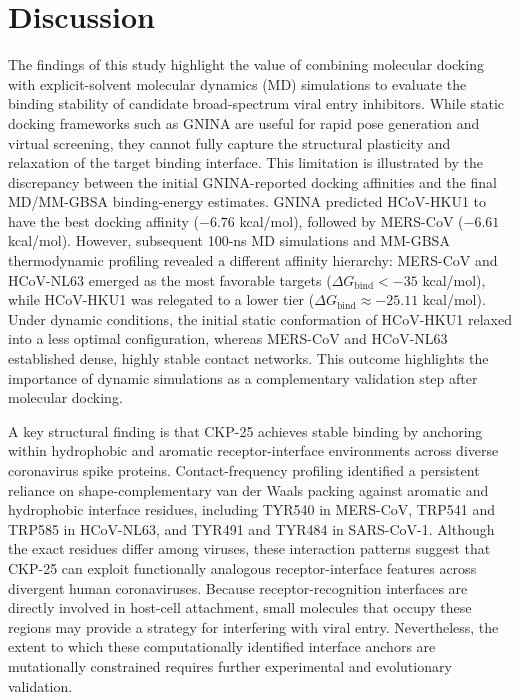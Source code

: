 \documentclass[pharmaceuticals,article,submit,pdftex,moreauthors]{Definitions/mdpi}
\begin{document}
\section{Discussion}
The findings of this study highlight the value of combining molecular docking with explicit-solvent molecular dynamics (MD) simulations to evaluate the binding stability of candidate broad-spectrum viral entry inhibitors. While static docking frameworks such as GNINA are useful for rapid pose generation and virtual screening, they cannot fully capture the structural plasticity and relaxation of the target binding interface. This limitation is illustrated by the discrepancy between the initial GNINA-reported docking affinities and the final MD/MM-GBSA binding-energy estimates. GNINA predicted HCoV-HKU1 to have the best docking affinity ($-6.76$ kcal/mol), followed by MERS-CoV ($-6.61$ kcal/mol). However, subsequent 100-ns MD simulations and MM-GBSA thermodynamic profiling revealed a different affinity hierarchy: MERS-CoV and HCoV-NL63 emerged as the most favorable targets ($\Delta G_{\text{bind}} < -35$ kcal/mol), while HCoV-HKU1 was relegated to a lower tier ($\Delta G_{\text{bind}} \approx -25.11$ kcal/mol). Under dynamic conditions, the initial static conformation of HCoV-HKU1 relaxed into a less optimal configuration, whereas MERS-CoV and HCoV-NL63 established dense, highly stable contact networks. This outcome highlights the importance of dynamic simulations as a complementary validation step after molecular docking.

A key structural finding is that CKP-25 achieves stable binding by anchoring within hydrophobic and aromatic receptor-interface environments across diverse coronavirus spike proteins. Contact-frequency profiling identified a persistent reliance on shape-complementary van der Waals packing against aromatic and hydrophobic interface residues, including TYR540 in MERS-CoV, TRP541 and TRP585 in HCoV-NL63, and TYR491 and TYR484 in SARS-CoV-1. Although the exact residues differ among viruses, these interaction patterns suggest that CKP-25 can exploit functionally analogous receptor-interface features across divergent human coronaviruses. Because receptor-recognition interfaces are directly involved in host-cell attachment, small molecules that occupy these regions may provide a strategy for interfering with viral entry. Nevertheless, the extent to which these computationally identified interface anchors are mutationally constrained requires further experimental and evolutionary validation.
\end{document}
